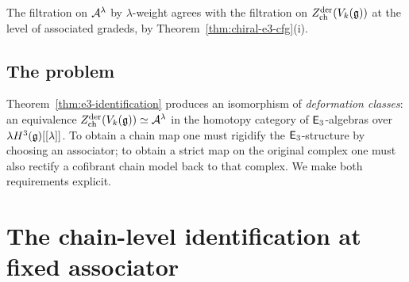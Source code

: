 The filtration on $\mathcal{A}^\lambda$ by $\lambda$-weight agrees
with the filtration on $Z^{\mathrm{der}}_{\mathrm{ch}}(V_k(\mathfrak{g}))$
at the level of associated gradeds, by
Theorem~\ref{thm:chiral-e3-cfg}(i).

\subsection{The problem}

Theorem~\ref{thm:e3-identification} produces an isomorphism of
\emph{deformation classes}: an equivalence
$Z^{\mathrm{der}}_{\mathrm{ch}}(V_k(\mathfrak{g})) \simeq \mathcal{A}^\lambda$
in the homotopy category of $\mathsf{E}_3$-algebras over
$\lambda H^3(\mathfrak{g})[[\lambda]]$. To obtain a chain map one must
rigidify the $\mathsf{E}_3$-structure by choosing an associator; to
obtain a strict map on the original complex one must also rectify a
cofibrant chain model back to that complex. We make both requirements
explicit.

\section{The chain-level identification at fixed associator}
\label{sec:chain-level-at-fixed-associator}


